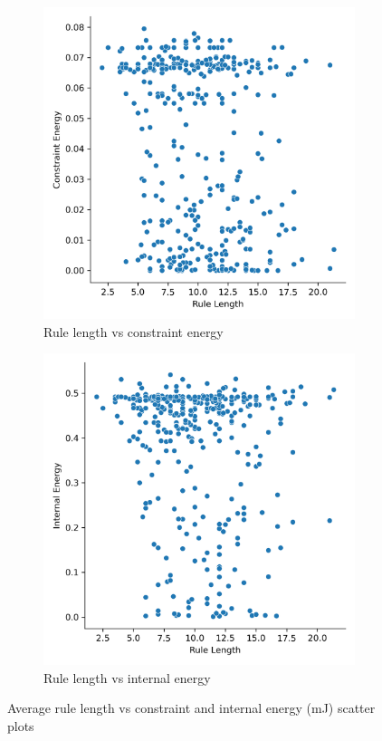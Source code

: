 \begin{figure}[H]
	\centering
	\begin{subfigure}[c]{0.45\textwidth}
		\centering
		\includegraphics[width=\textwidth]{rl_vs_ce.png}
		\caption{Rule length vs constraint energy}
	\end{subfigure}
	\hfill
	\begin{subfigure}[c]{0.45\textwidth}
		\centering
		\includegraphics[width=\textwidth]{rl_vs_ie.png}
		\caption{Rule length vs internal energy}
	\end{subfigure}
	\caption[Rule length vs system energies]{Average rule length vs constraint and internal energy (\si{mJ}) scatter plots}
	\label{fig:rl_v_e}
\end{figure}

